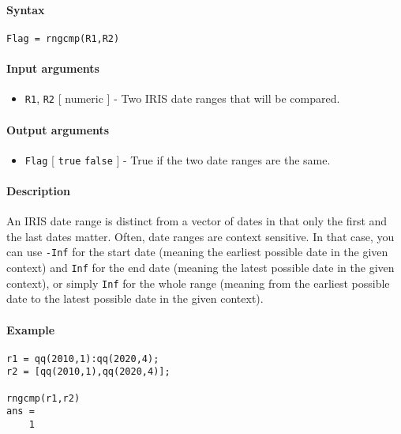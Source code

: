 


	\paragraph{Syntax}\label{syntax}

\begin{verbatim}
Flag = rngcmp(R1,R2)
\end{verbatim}

\paragraph{Input arguments}\label{input-arguments}

\begin{itemize}
\itemsep1pt\parskip0pt
\item
  \texttt{R1}, \texttt{R2} {[} numeric {]} - Two IRIS date ranges that
  will be compared.
\end{itemize}

\paragraph{Output arguments}\label{output-arguments}

\begin{itemize}
\itemsep1pt\parskip0pt
\item
  \texttt{Flag} {[} \texttt{true} \textbar{} \texttt{false} {]} - True
  if the two date ranges are the same.
\end{itemize}

\paragraph{Description}\label{description}

An IRIS date range is distinct from a vector of dates in that only the
first and the last dates matter. Often, date ranges are context
sensitive. In that case, you can use \texttt{-Inf} for the start date
(meaning the earliest possible date in the given context) and
\texttt{Inf} for the end date (meaning the latest possible date in the
given context), or simply \texttt{Inf} for the whole range (meaning from
the earliest possible date to the latest possible date in the given
context).

\paragraph{Example}\label{example}

\begin{verbatim}
r1 = qq(2010,1):qq(2020,4);
r2 = [qq(2010,1),qq(2020,4)];

rngcmp(r1,r2)
ans =
    1
\end{verbatim}


